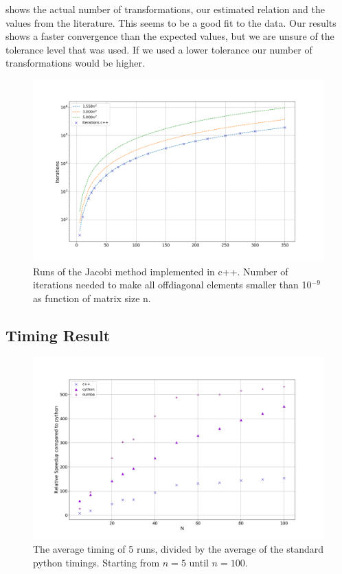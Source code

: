  shows the
actual number of transformations, our estimated relation and the values from the
literature. This seems to be a good fit to the data. Our results shows a faster
convergence than the expected values, but we are unsure of the tolerance level
that was used. If we used a lower tolerance our number of transformations would
be higher.




\begin{figure}[H]
  \centering
  \includegraphics[width=1.0\textwidth]{../figures/iterations.png}

  \caption{Runs of the Jacobi method implemented in c++. Number of iterations
  needed to make all offdiagonal elements smaller than 10$^{-9}$ as function of
  matrix size n.}

  \label{fig:iterations}
\end{figure}


\subsection{Timing Result}

\begin{figure}[H]
  \centering
  \includegraphics[width=1.0\textwidth]{../figures/avgspeed.png}
  \caption{ The average timing of 5 runs, divided by the average of the standard
  python timings. Starting from $n=5$ until $n=100$. }
  \label{fig:comp_python}
\end{figure}

